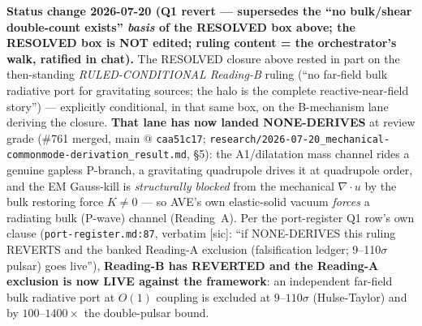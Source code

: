 \begin{warningbox}
\textbf{Status change 2026-07-20 (Q1 revert --- supersedes the ``no bulk/shear
double-count exists'' \emph{basis} of the RESOLVED box above; the RESOLVED box is
NOT edited; ruling content = the orchestrator's walk, ratified in chat).} The
RESOLVED closure above rested in part on the then-standing \emph{RULED-CONDITIONAL
Reading-B} ruling (``no far-field bulk radiative port for gravitating sources; the
halo is the complete reactive-near-field story'') --- explicitly conditional, in
that same box, on the B-mechanism lane deriving the closure. \textbf{That lane has
now landed NONE-DERIVES} at review grade (\#761 merged, main @ \texttt{caa51c17};
\texttt{research/2026-07-20\_mechanical-commonmode-derivation\_result.md}, \S5):
the A1/dilatation mass channel rides a genuine gapless P-branch, a gravitating
quadrupole drives it at quadrupole order, and the EM Gauss-kill is
\emph{structurally blocked} from the mechanical $\nabla\!\cdot\!u$ by the bulk
restoring force $K\neq0$ --- so AVE's own elastic-solid vacuum \emph{forces} a
radiating bulk (P-wave) channel (Reading~A). Per the port-register Q1 row's own
clause (\texttt{port-register.md:87}, verbatim [sic]: ``if NONE-DERIVES this
ruling REVERTS and the banked Reading-A exclusion (falsification ledger;
9--110$\sigma$ pulsar) goes live''), \textbf{Reading-B has REVERTED and the
Reading-A exclusion is now LIVE against the framework}: an independent far-field
bulk radiative port at $O(1)$ coupling is excluded at $9$--$110\sigma$
(Hulse-Taylor) and by $100$--$1400\times$ the double-pulsar bound.


\end{warningbox}
